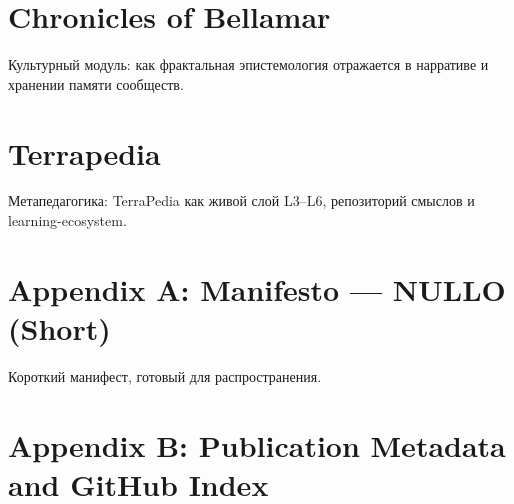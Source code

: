 \documentclass[11pt,oneside]{book}
\begin{document}
\chapter{Chronicles of Bellamar}
Культурный модуль: как фрактальная эпистемология отражается в нарративе и хранении памяти сообществ.

\chapter{Terrapedia}
Метапедагогика: TerraPedia как живой слой L3–L6, репозиторий смыслов и learning-ecosystem.

\appendix
\chapter{Appendix A: Manifesto — NULLO (Short)}
Короткий манифест, готовый для распространения.

\chapter{Appendix B: Publication Metadata and GitHub Index}
\nocite{*}


\end{document}
